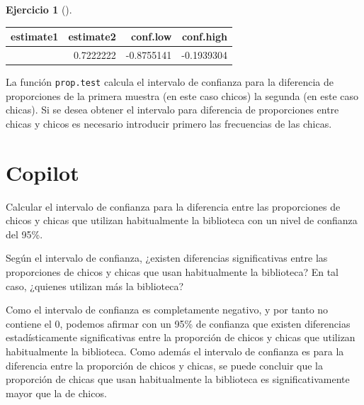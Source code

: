 \documentclass[
  a4paper,
]{scrreport}
\newenvironment{Shaded}{\begin{snugshade}}{\end{snugshade}}
\newcommand{\ExtensionTok}[1]{\textcolor[rgb]{0.00,0.23,0.31}{#1}}
\newcommand{\NormalTok}[1]{\textcolor[rgb]{0.00,0.23,0.31}{#1}}
\newcommand{\PreprocessorTok}[1]{\textcolor[rgb]{0.68,0.00,0.00}{#1}}
\theoremstyle{definition}
\newtheorem{exercise}{Ejercicio}[chapter]
\theoremstyle{remark}
\begin{document}
\begin{exercise}[]
\begin{enumerate}
\begin{tcolorbox}
  \begin{longtable}[]{@{}rrrr@{}}
  \toprule\noalign{}
  estimate1 & estimate2 & conf.low & conf.high \\
  \midrule\noalign{}
  \endhead
  \bottomrule\noalign{}
  \endlastfoot
  0.1875 & 0.7222222 & -0.8755141 & -0.1939304 \\
  \end{longtable}

  \begin{tcolorbox}[enhanced jigsaw, colframe=quarto-callout-warning-color-frame, toprule=.15mm, bottomtitle=1mm, breakable, opacitybacktitle=0.6, toptitle=1mm, colback=white, bottomrule=.15mm, title=\textcolor{quarto-callout-warning-color}{\faExclamationTriangle}\hspace{0.5em}{Advertencia}, arc=.35mm, left=2mm, titlerule=0mm, rightrule=.15mm, coltitle=black, leftrule=.75mm, opacityback=0, colbacktitle=quarto-callout-warning-color!10!white]

  La función \texttt{prop.test} calcula el intervalo de confianza para
  la diferencia de proporciones de la primera muestra (en este caso
  chicos) la segunda (en este caso chicas). Si se desea obtener el
  intervalo para diferencia de proporciones entre chicas y chicos es
  necesario introducir primero las frecuencias de las chicas.

  \end{tcolorbox}

  \section{Copilot}

\begin{Shaded}
\begin{Highlighting}[]
\ExtensionTok{Calcular}\NormalTok{ el intervalo de confianza para la diferencia entre las proporciones de chicos y chicas que utilizan habitualmente la biblioteca con un nivel de confianza del 95\%.}

\ExtensionTok{Según}\NormalTok{ el intervalo de confianza, ¿existen diferencias significativas entre las proporciones de chicos y chicas que usan habitualmente la biblioteca}\PreprocessorTok{?}\NormalTok{ En tal caso, ¿quienes utilizan más la biblioteca}\PreprocessorTok{?}
\end{Highlighting}
\end{Shaded}

  Como el intervalo de confianza es completamente negativo, y por tanto
  no contiene el 0, podemos afirmar con un 95\% de confianza que existen
  diferencias estadísticamente significativas entre la proporción de
  chicos y chicas que utilizan habitualmente la biblioteca. Como además
  el intervalo de confianza es para la diferencia entre la proporción de
  chicos y chicas, se puede concluir que la proporción de chicas que
  usan habitualmente la biblioteca es significativamente mayor que la de
  chicos.

  \end{tcolorbox}
\end{enumerate}

\end{exercise}
\end{document}
